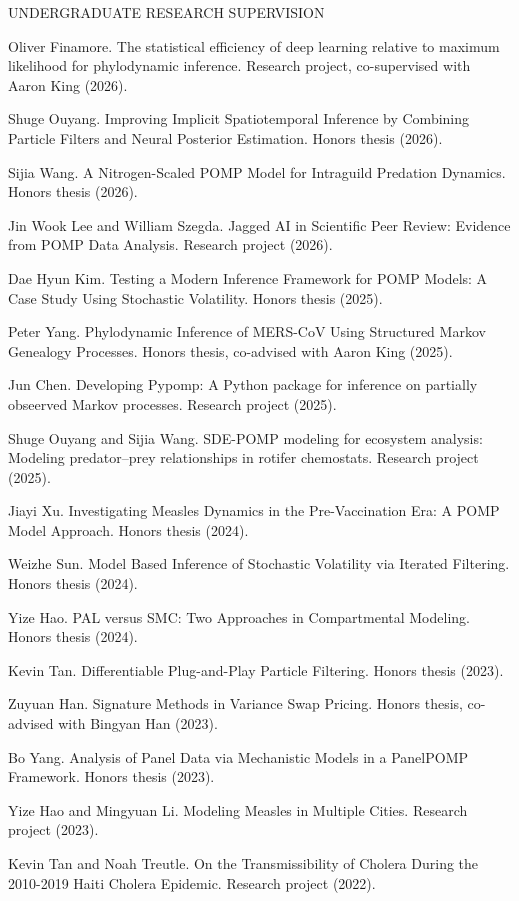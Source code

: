 \lsp
\begin{reflist}{UNDERGRADUATE RESEARCH SUPERVISION}
\item{Oliver Finamore}. The statistical efficiency of deep learning relative to maximum likelihood for phylodynamic inference. Research project, co-supervised with Aaron King (2026).
\item{Shuge Ouyang}. Improving Implicit Spatiotemporal Inference by Combining Particle Filters and Neural Posterior Estimation. Honors thesis (2026).
\item{Sijia Wang}. A Nitrogen-Scaled POMP Model for Intraguild Predation Dynamics. Honors thesis (2026).
\item{Jin Wook Lee and William Szegda}. Jagged AI in Scientific Peer Review: Evidence from POMP Data Analysis. Research project (2026).
\item{Dae Hyun Kim}. Testing a Modern Inference Framework for POMP Models: A Case Study Using Stochastic Volatility. Honors thesis (2025).
\item{Peter Yang}. Phylodynamic Inference of MERS-CoV Using Structured Markov Genealogy Processes. Honors thesis, co-advised with Aaron King (2025).
\item{Jun Chen}. Developing Pypomp: A Python package for inference on partially obseerved Markov processes. Research project (2025).
\item{Shuge Ouyang and Sijia Wang}. SDE-POMP modeling for ecosystem analysis:
Modeling predator–prey relationships in rotifer chemostats. Research project (2025).
\item{Jiayi Xu}. Investigating Measles Dynamics in the Pre-Vaccination Era: A POMP Model Approach. Honors thesis (2024).
\item{Weizhe Sun}. Model Based Inference of Stochastic Volatility via Iterated Filtering. Honors thesis (2024).
\item{Yize Hao}. PAL versus SMC: Two Approaches in Compartmental Modeling. Honors thesis (2024).
\item{Kevin Tan}. Differentiable Plug-and-Play Particle Filtering. Honors thesis (2023).
\item{Zuyuan Han}. Signature Methods in Variance Swap Pricing. Honors thesis, co-advised with Bingyan Han (2023).  
\item{Bo Yang}. Analysis of Panel Data via Mechanistic Models in a PanelPOMP Framework. Honors thesis (2023).
  \item{Yize Hao and Mingyuan Li}. Modeling Measles in Multiple Cities. Research project (2023).
\item{Kevin Tan and Noah Treutle}. On the Transmissibility of Cholera During the 2010-2019 Haiti Cholera Epidemic. Research project (2022).

\end{reflist}
